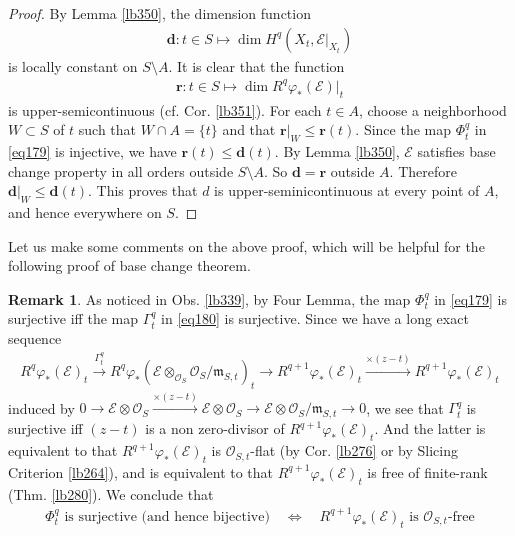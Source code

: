 \documentclass[12pt,b5paper,notitlepage]{report}
\theoremstyle{definition}
\newtheorem{rem}[df]{Remark}
\theoremstyle{plain}
\newcommand{\scr}{\mathscr}
\newcommand{\mbf}{\mathbf}
\newcommand{\mk}{\mathfrak m}
\numberwithin{equation}{section}
\begin{document}
\begin{proof}
By Lemma \ref{lb350}, the dimension function
\begin{align*}
\mbf d:t\in S\mapsto \dim H^q(X_t,\scr E|_{X_t})
\end{align*}
is locally constant on $S\setminus A$. It is clear that the function
\begin{align*}
\mbf r:t\in S\mapsto \dim R^q\varphi_*(\scr E)|_t
\end{align*}
is upper-semicontinuous (cf. Cor. \ref{lb351}). For each $t\in A$, choose a neighborhood $W\subset S$ of $t$ such that $W\cap A=\{t\}$ and that $\mbf r|_W\leq \mbf r(t)$. Since the map $\Phi_t^q$ in \eqref{eq179} is injective, we have $\mbf r(t)\leq \mbf d(t)$. By Lemma \ref{lb350}, $\scr E$ satisfies base change property in all orders outside $S\setminus A$. So $\mbf d=\mbf r$ outside $A$. Therefore $\mbf d|_W\leq\mbf d(t)$. This proves that $d$ is upper-seminicontinuous at every point of $A$, and hence everywhere on $S$.
\end{proof}



Let us make some comments on the above proof, which will be helpful for the following proof of base change theorem.



\begin{rem}
As noticed in Obs. \ref{lb339}, by Four Lemma, the map $\Phi_t^q$ in \eqref{eq179} is surjective iff the map $\Gamma_t^q$ in \eqref{eq180} is surjective. Since we have a long exact sequence
\begin{align*}
R^q\varphi_*(\scr E)_t\xrightarrow{\Gamma_t^q}R^q\varphi_*(\scr E\otimes_{\scr O_S}\scr O_S/\mk_{S,t})_t \rightarrow R^{q+1}\varphi_*(\scr E)_t\xrightarrow {\times (z-t)}R^{q+1}\varphi_*(\scr E)_t
\end{align*}
induced by $0\rightarrow \scr E\otimes \scr O_S\xrightarrow{\times (z-t)}\scr E\otimes \scr O_S\rightarrow \scr E\otimes \scr O_S/\mk_{S,t}\rightarrow 0$, we see that $\Gamma_t^q$ is surjective iff $(z-t)$ is a non zero-divisor of $R^{q+1}\varphi_*(\scr E)_t$. And the latter is equivalent to that $R^{q+1}\varphi_*(\scr E)_t$ is $\scr O_{S,t}$-flat (by Cor. \ref{lb276} or by Slicing Criterion \ref{lb264}), and is equivalent to that $R^{q+1}\varphi_*(\scr E)_t$ is free of finite-rank (Thm. \ref{lb280}). We conclude that
\begin{align}
\Phi_t^q\text{ is surjective (and hence bijective)}\quad\Longleftrightarrow\quad R^{q+1}\varphi_*(\scr E)_t\text{ is $\scr O_{S,t}$-free}  \label{eq183}
\end{align}
\end{rem}
\end{document}
